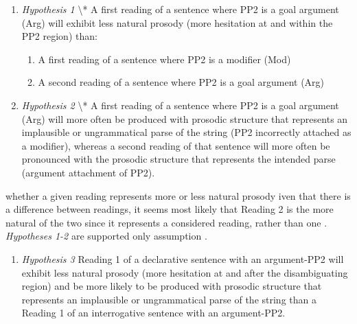 \documentclass[12pt,oneside]{book}
\providecommand{\tightlist}{%
  \setlength{\itemsep}{0pt}\setlength{\parskip}{0pt}}
\begin{document}
\begin{enumerate}
\def\labelenumi{(\arabic{enumi})}
\setcounter{enumi}{50}
\tightlist
\item
  \emph{Hypothesis 1} \textbackslash{}*
  A first reading of a sentence where PP2 is a goal argument (Arg) will exhibit less natural prosody (more hesitation at and within the PP2 region) than:

  \begin{enumerate}
  \def\labelenumii{\alph{enumii}.}
  \tightlist
  \item
    A first reading of a sentence where PP2 is a modifier (Mod)
  \item
    A second reading of a sentence where PP2 is a goal argument (Arg)
  \end{enumerate}
\item
  \emph{Hypothesis 2} \textbackslash{}*
  A first reading of a sentence where PP2 is a goal argument (Arg) will more often be produced with prosodic structure that represents an implausible or ungrammatical parse of the string (PP2 incorrectly attached as a modifier), whereas a second reading of that sentence will more often be pronounced with the prosodic structure that represents the intended parse (argument attachment of PP2).
\end{enumerate}

 whether a given reading represents more or less natural prosody iven that there is a difference between readings, it seems most likely that Reading 2 is the more natural of the two since it represents a considered reading, rather than  one . \emph{Hypotheses 1-2} are supported only  assumption .

\begin{enumerate}
\def\labelenumi{(\arabic{enumi})}
\setcounter{enumi}{52}
\tightlist
\item
  \emph{Hypothesis 3}
  Reading 1 of a declarative sentence with an argument-PP2 will exhibit less natural prosody (more hesitation at and after the disambiguating region) and be more likely to be produced with prosodic structure that represents an implausible or ungrammatical parse of the string than a Reading 1 of an interrogative sentence with an argument-PP2.
\end{enumerate}
\end{document}
